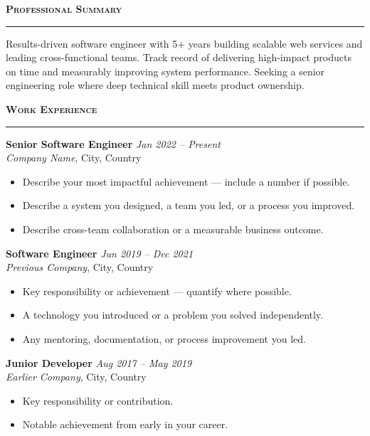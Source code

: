 \documentclass[10pt, a4paper]{article}
\newcommand{\mainheading}[1]{%
  \vspace{10pt}%
  {\normalsize\textsc{\textbf{#1}}}\\[-4pt]%
  \rule{\linewidth}{0.4pt}%
  \vspace{4pt}%
}
\newcommand{\jobentry}[4]{%
  \noindent\textbf{#1} \hfill \textit{\small #4} \\%
  \textit{\small #2}, {\small #3}%
  \vspace{3pt}%
}
\begin{document}
\begin{minipage}[t]{0.67\textwidth}


  \mainheading{Professional Summary}

  {\small
  Results-driven software engineer with 5+ years building scalable web services
  and leading cross-functional teams. Track record of delivering high-impact
  products on time and measurably improving system performance. Seeking a senior
  engineering role where deep technical skill meets product ownership.
  }

  \mainheading{Work Experience}

  \jobentry{Senior Software Engineer}{Company Name}{City, Country}{Jan 2022 -- Present}
  \begin{itemize}[leftmargin=1.2em, itemsep=1pt, topsep=3pt, parsep=0pt]
    \small
    \item Describe your most impactful achievement — include a number if possible.
    \item Describe a system you designed, a team you led, or a process you improved.
    \item Describe cross-team collaboration or a measurable business outcome.
  \end{itemize}

  \vspace{6pt}

  \jobentry{Software Engineer}{Previous Company}{City, Country}{Jun 2019 -- Dec 2021}
  \begin{itemize}[leftmargin=1.2em, itemsep=1pt, topsep=3pt, parsep=0pt]
    \small
    \item Key responsibility or achievement — quantify where possible.
    \item A technology you introduced or a problem you solved independently.
    \item Any mentoring, documentation, or process improvement you led.
  \end{itemize}

  \vspace{6pt}

  \jobentry{Junior Developer}{Earlier Company}{City, Country}{Aug 2017 -- May 2019}
  \begin{itemize}[leftmargin=1.2em, itemsep=1pt, topsep=3pt, parsep=0pt]
    \small
    \item Key responsibility or contribution.
    \item Notable achievement from early in your career.
  \end{itemize}


\end{minipage}
\end{document}
